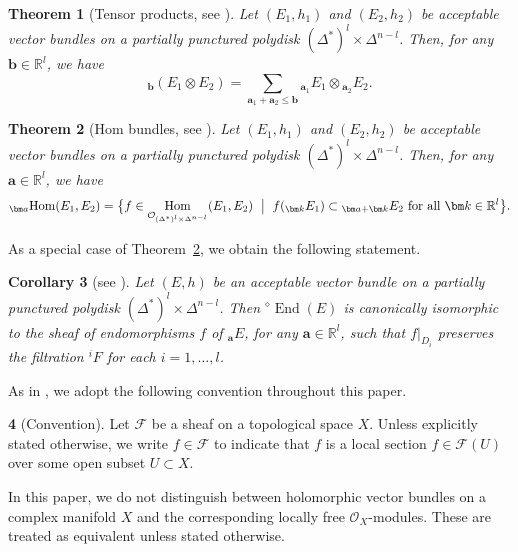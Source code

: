 \documentclass[12pt,twoside]{amsart}
\DeclareMathOperator{\End}{End}
\DeclareMathOperator{\Hom}{Hom}
\newtheorem{thm}{Theorem}[section]
\newtheorem{cor}[thm]{Corollary}
\theoremstyle{definition}
\newtheorem{say}[thm]{}
\begin{document}
\begin{thm}[{Tensor 
products, see \cite[Theorem 1.14]{fujino-fujisawa-ono}}]\label{x-thm1.6}
Let $(E_1, h_1)$ and $(E_2, h_2)$ be acceptable vector bundles on a
partially punctured polydisk $(\Delta^*)^l \times \Delta^{n-l}$.
Then, for any $\bm b \in \mathbb R^l$, we have
\[
{}_{\bm b}(E_1 \otimes E_2)
=
\sum_{\bm a_1 + \bm a_2 \leq \bm b}
{}_{\bm a_1} E_1 \otimes {}_{\bm a_2} E_2.
\]
\end{thm}

\begin{thm}[{Hom bundles, 
see \cite[Proposition 17.1]{fujino-fujisawa-ono}}]\label{x-thm1.7}
Let $(E_1, h_1)$ and $(E_2, h_2)$ be acceptable vector bundles on a
partially punctured polydisk $(\Delta^*)^l \times \Delta^{n-l}$.
Then, for any $\bm a \in \mathbb R^l$, we have
\[
{}_{\bm a}\!\Hom(E_1, E_2)
=
\bigl\{
f \in \Hom_{\mathcal O_{(\Delta^*)^l \times \Delta^{n-l}}}(E_1, E_2)
\ \bigm|\
f({}_{\bm k} E_1) \subset {}_{\bm a + \bm k} E_2
\text{ for all } \bm k \in \mathbb R^l
\bigr\}.
\]
\end{thm}

As a special case of Theorem~\ref{x-thm1.7}, we obtain the following
statement.

\begin{cor}[{see \cite[Proposition~21.3.3]{mochizuki4}}]\label{x-cor1.8}
Let $(E, h)$ be an acceptable vector bundle on a partially punctured
polydisk $(\Delta^*)^l \times \Delta^{n-l}$.
Then ${}^\diamond\!\End(E)$ is canonically isomorphic to the sheaf of
endomorphisms $f$ of ${}_{\bm a} E$, for any $\bm a \in \mathbb R^l$,
such that $f|_{D_i}$ preserves the filtration ${}^i\!F$
for each $i = 1, \ldots, l$.
\end{cor}

As in \cite{fujino-fujisawa-ono}, we adopt the following convention
throughout this paper.

\begin{say}[Convention]\label{x-say1.9}
Let $\mathcal{F}$ be a sheaf on a topological space $X$.  
Unless explicitly stated otherwise, we write  
$f \in \mathcal{F}$ to indicate that $f$ is a local section  
$f \in \mathcal{F}(U)$ over some open subset $U \subset X$.  

In this paper, we do not distinguish between holomorphic vector bundles  
on a complex manifold $X$ and the corresponding locally free  
$\mathcal{O}_X$-modules. These are treated as equivalent  
unless stated otherwise.
\end{say}
\end{document}
